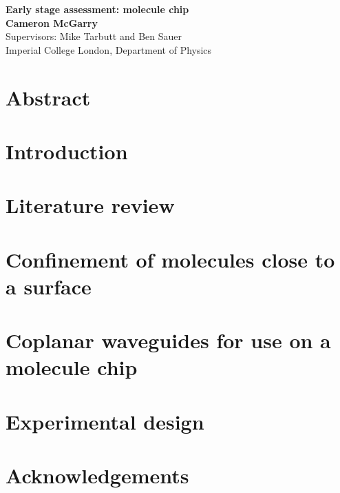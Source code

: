 \documentclass[
 aps,
 prb,
 a4paper,
 superscriptaddress,
 notitlepage,
 nofootinbib,
 preprint %
]{revtex4-1}
\begin{document}

\begin{titlepage}
  \begin{center}
    \vspace*{1cm}
    \textbf{Early stage assessment: molecule chip} \\
    \vspace{1.5cm}
     \textbf{Cameron McGarry} \\
    \vspace{0.5cm}
     Supervisors: Mike Tarbutt and Ben Sauer \\
    \vspace{0.5cm}
     {Imperial College London, Department of Physics} \\
  \end{center}
\end{titlepage}



\section*{Abstract}

\clearpage

\tableofcontents
\clearpage



\section{Introduction}


\section{Literature review}


\section{Confinement of molecules close to a surface}


\section{Coplanar waveguides for use on a molecule chip}
\label{sec:cpw}


\section{Experimental design}


\section*{Acknowledgements}





\end{document}
